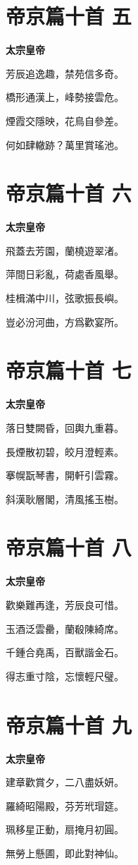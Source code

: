 \documentclass[12pt,a4paper]{ctexbook}
\begin{document}
\section{帝京篇十首 五}
\textbf{太宗皇帝}\par\vspace{0.5em}
芳辰追逸趣，禁苑信多奇。\par
橋形通漢上，峰勢接雲危。\par
煙霞交隱映，花鳥自參差。\par
何如肆轍跡？萬里賞瑤池。\par

\section{帝京篇十首 六}
\textbf{太宗皇帝}\par\vspace{0.5em}
飛蓋去芳園，蘭橈遊翠渚。\par
萍間日彩亂，荷處香風舉。\par
桂楫滿中川，弦歌振長嶼。\par
豈必汾河曲，方爲歡宴所。\par

\section{帝京篇十首 七}
\textbf{太宗皇帝}\par\vspace{0.5em}
落日雙闕昏，回輿九重暮。\par
長煙散初碧，皎月澄輕素。\par
搴幌翫琴書，開軒引雲霧。\par
斜漢耿層閣，清風搖玉樹。\par

\section{帝京篇十首 八}
\textbf{太宗皇帝}\par\vspace{0.5em}
歡樂難再逢，芳辰良可惜。\par
玉酒泛雲罍，蘭殽陳綺席。\par
千鍾合堯禹，百獸諧金石。\par
得志重寸陰，忘懷輕尺璧。\par

\section{帝京篇十首 九}
\textbf{太宗皇帝}\par\vspace{0.5em}
建章歡賞夕，二八盡妖妍。\par
羅綺昭陽殿，芬芳玳瑁筵。\par
珮移星正動，扇掩月初圓。\par
無勞上懸圃，即此對神仙。\par
\end{document}
